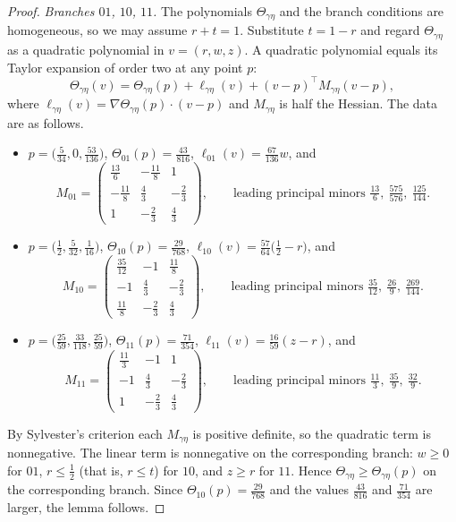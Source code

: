 \documentclass{amsart}
\theoremstyle{definition}
\numberwithin{equation}{section}
\numberwithin{table}{section}
\begin{document}
\begin{proof}
\emph{Branches $01$, $10$, $11$.} The polynomials $\Theta_{\gamma\eta}$ and the branch conditions are homogeneous, so we may assume $r+t=1$. Substitute $t=1-r$ and regard $\Theta_{\gamma\eta}$ as a quadratic polynomial in $v=(r,w,z)$. A quadratic polynomial equals its Taylor expansion of order two at any point $p$:
\[
\Theta_{\gamma\eta}(v)=\Theta_{\gamma\eta}(p)+\ell_{\gamma\eta}(v)+(v-p)^{\top}M_{\gamma\eta}(v-p),
\]
where $\ell_{\gamma\eta}(v)=\nabla\Theta_{\gamma\eta}(p)\cdot(v-p)$ and $M_{\gamma\eta}$ is half the Hessian. The data are as follows.
\begin{itemize}
\item[$01$:] $p=\bigl(\frac5{34},0,\frac{53}{136}\bigr)$, $\Theta_{01}(p)=\frac{43}{816}$, $\ell_{01}(v)=\frac{67}{136}w$, and
\[
M_{01}=\begin{pmatrix}\frac{13}6&-\frac{11}8&1\\[2pt]-\frac{11}8&\frac43&-\frac23\\[2pt]1&-\frac23&\frac43\end{pmatrix},\qquad\text{leading principal minors } \tfrac{13}6,\ \tfrac{575}{576},\ \tfrac{125}{144}.
\]
\item[$10$:] $p=\bigl(\frac12,\frac5{32},\frac1{16}\bigr)$, $\Theta_{10}(p)=\frac{29}{768}$, $\ell_{10}(v)=\frac{57}{64}\bigl(\frac12-r\bigr)$, and
\[
M_{10}=\begin{pmatrix}\frac{35}{12}&-1&\frac{11}8\\[2pt]-1&\frac43&-\frac23\\[2pt]\frac{11}8&-\frac23&\frac43\end{pmatrix},\qquad\text{leading principal minors } \tfrac{35}{12},\ \tfrac{26}{9},\ \tfrac{269}{144}.
\]
\item[$11$:] $p=\bigl(\frac{25}{59},\frac{33}{118},\frac{25}{59}\bigr)$, $\Theta_{11}(p)=\frac{71}{354}$, $\ell_{11}(v)=\frac{16}{59}(z-r)$, and
\[
M_{11}=\begin{pmatrix}\frac{11}3&-1&1\\[2pt]-1&\frac43&-\frac23\\[2pt]1&-\frac23&\frac43\end{pmatrix},\qquad\text{leading principal minors } \tfrac{11}3,\ \tfrac{35}9,\ \tfrac{32}9.
\]
\end{itemize}
By Sylvester's criterion each $M_{\gamma\eta}$ is positive definite, so the quadratic term is nonnegative. The linear term is nonnegative on the corresponding branch: $w\ge 0$ for $01$, $r\le\frac12$ (that is, $r\le t$) for $10$, and $z\ge r$ for $11$. Hence $\Theta_{\gamma\eta}\ge\Theta_{\gamma\eta}(p)$ on the corresponding branch. Since $\Theta_{10}(p)=\frac{29}{768}$ and the values $\frac{43}{816}$ and $\frac{71}{354}$ are larger, the lemma follows.
\end{proof}
\end{document}
